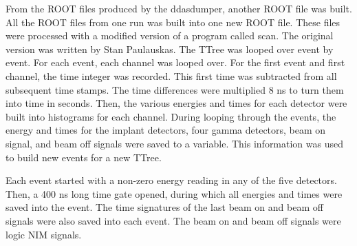 \documentclass[../MaxHughesThesis.tex]{subfiles}
\begin{document}
From the ROOT files produced by the ddasdumper, another ROOT file was built.
All the ROOT files from one run was built into one new ROOT file. 
These files were processed with a modified version of a program called scan.
The original version was written by Stan Paulauskas.
The TTree was looped over event by event.
For each event, each channel was looped over. 
For the first event and first channel, the time integer was recorded. 
This first time was subtracted from all subsequent time stamps.
The time differences were multiplied 8 ns to turn them into time in seconds. 
Then, the various energies and times for each detector were built into histograms for each channel. 
During looping through the events, the energy and times for the implant detectors, four gamma detectors, beam on signal, and beam off signals were saved to a variable.
This information was used to build new events for a new TTree.

Each event started with a non-zero energy reading in any of the five detectors.
Then, a 400 ns long time gate opened, during which all energies and times were saved into the event.
The time signatures of the last beam on and beam off signals were also saved into each event.
The beam on and beam off signals were logic NIM signals.
\end{document}
